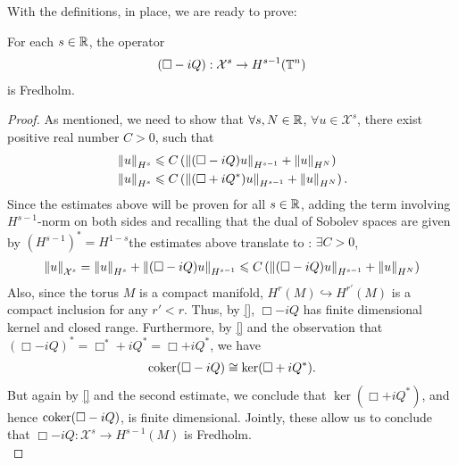 \documentclass[12pt]{article}
\begin{document}
With the definitions, in place, we are ready to prove: 
\begin{ftheorem}
    For each $s \in \R$, the operator
    \begin{align*}
    (\Box - iQ): \mathcal{X}^s \to H^{s - 1}(\T^n)
    \end{align*}
    is Fredholm. 
\end{ftheorem}
\begin{proof}
    As mentioned, we need to show that $\forall s, N \in \R$, $\forall u \in \mathcal{X}^s$, there exist positive real number $C > 0$, such that
    \begin{align} \label{eq : fredholm estimate for wave operator} 
    &\norm[u]_{H^s} \leq C \brac{ \norm[(\Box - i Q)u]_{H^{s - 1}} + \norm[u]_{H^N}} \\
    &\norm[u]_{H^s} \leq C \brac{ \norm[(\Box + i Q^*)u]_{H^{s - 1}} + \norm[u]_{H^N}}. 
    \end{align}
    Since the estimates above will be proven for all $s \in \R$, adding the term involving $H^{s-1}$-norm on both sides and recalling that the dual of Sobolev spaces are given by $(H^{s - 1})^* = H^{1 - s}$the estimates above translate to : $\exists C > 0$, 
    \begin{align*}
    \norm[u]_{\mathcal{X}^s} = \norm[u]_{H^s} + \norm[(\Box - iQ)u]_{H^{s - 1}} \leq C \brac{ \norm[(\Box - i Q)u]_{H^{s - 1}} + \norm[u]_{H^N}}
    \end{align*}
    Also, since the torus $M$ is a compact manifold, $H^{r}(M) \hookrightarrow H^{r'}(M)$ is a compact inclusion for any $r' < r$. Thus, by \ref{}, $\Box - iQ$ has finite dimensional kernel and closed range. Furthermore, by \ref{} and the observation that $(\Box - iQ)^* = \Box^* + iQ^* = \Box + iQ^*$, we have
    \begin{align*}
    \coker (\Box - iQ) \cong \ker(\Box + iQ^*). 
    \end{align*}
    But again by \ref{} and the second estimate, we conclude that $\ker (\Box + iQ^*)$, and hence $\coker (\Box - iQ)$, is finite dimensional. Jointly, these allow us to conclude that $\Box - iQ : \mathcal{X}^s \to H^{s - 1}(M)$ is Fredholm. \\
    

\end{proof}
\end{document}
